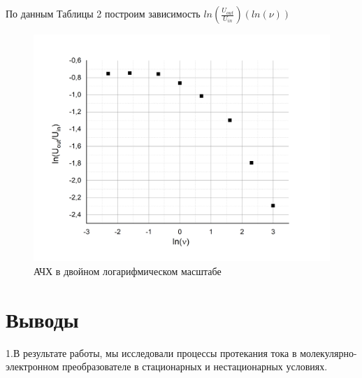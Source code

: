 \documentclass[a4paper,12pt]{article}
\begin{document}
По данным Таблицы 2 построим зависимость $ln(\frac{U_{out}}{U_{in}}) (ln(\nu))$

\begin{figure}[h!]
	\begin{center}
		\includegraphics[scale=0.6]{graph2}
		\caption{АЧХ в двойном логарифмическом масштабе}
	\end{center}
\end{figure}

\section{Выводы}
1.В результате работы, мы исследовали процессы протекания тока в молекулярно-электронном преобразователе в стационарных и нестационарных условиях.
\end{document}
